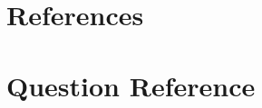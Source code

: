 \documentclass[AER]{/Users/zyl357/Documents/GitHub/research-dissertation-case-for-alt-ed/papers/alt-ed-survey/aea-latex-templates/AEA}
\begin{document}
\section{References}




\appendix

\section{Question Reference}
\end{document}
